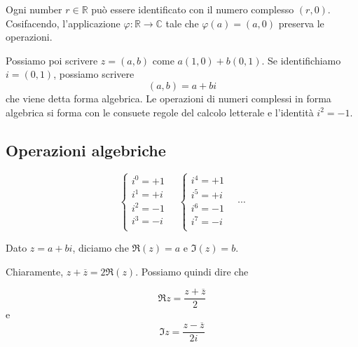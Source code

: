 \documentclass[a4paper]{article}
\begin{document}
Ogni number \(r\in\mathbb{R}\) può essere identificato con il numero complesso \((r, 0)\).
Cosifacendo, l'applicazione \(\varphi\colon \mathbb{R} \to \mathbb{C}\)
tale che \(\varphi(a) = (a,0)\) preserva le operazioni.

Possiamo poi scrivere \(z=(a,b)\) come \(a(1,0) + b(0,1)\).
Se identifichiamo \(i=(0,1)\), possiamo scrivere
\[
    (a,b) = a+bi
\]
che viene detta forma algebrica.
Le operazioni di numeri complessi in forma algebrica si forma con le consuete regole del calcolo letterale
e l'identità \(i^2 = -1\).

\subsection{Operazioni algebriche}

\[
    \begin{cases}
        i^0=+1\\
        i^1=+i\\
        i^2=-1\\
        i^3=-i\\
    \end{cases}
    \quad
    \begin{cases}
        i^4=+1\\
        i^5=+i\\
        i^6=-1\\
        i^7=-i\\
    \end{cases}
    \quad
    \cdots
\]

Dato \(z=a+bi\), diciamo che \(\Re(z) =a\) e \(\Im(z) = b\).


Chiaramente, \(z + \overline{z} = 2\Re(z)\). Possiamo quindi dire che

\[
    \Re z = \frac{z + \overline{z}}{2}
\]
e
\[
    \Im z = \frac{z-\overline{z}}{2i}
\]

\end{document}

